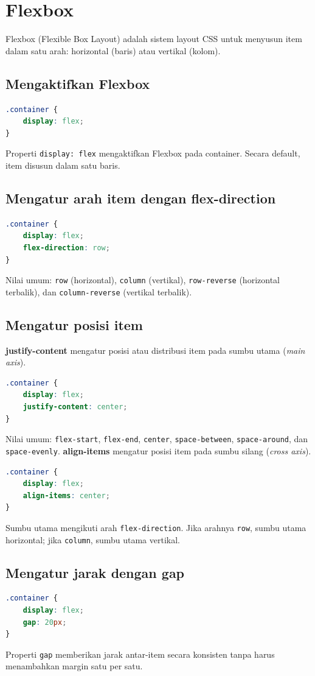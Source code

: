 \documentclass[11pt,a4paper]{article}
\begin{document}
\section{Flexbox}
Flexbox (Flexible Box Layout) adalah sistem layout CSS untuk menyusun item dalam satu arah: horizontal (baris) atau vertikal (kolom).
\subsection{Mengaktifkan Flexbox}
\begin{lstlisting}[language=CSS]
.container {
    display: flex;
}
\end{lstlisting}
Properti \texttt{display: flex} mengaktifkan Flexbox pada container. Secara default, item disusun dalam satu baris.
\subsection{Mengatur arah item dengan flex-direction}
\begin{lstlisting}[language=CSS]
.container {
    display: flex;
    flex-direction: row;
}
\end{lstlisting}
Nilai umum: \texttt{row} (horizontal), \texttt{column} (vertikal), \texttt{row-reverse} (horizontal terbalik), dan \texttt{column-reverse} (vertikal terbalik).
\subsection{Mengatur posisi item}
\textbf{justify-content} mengatur posisi atau distribusi item pada sumbu utama (\textit{main axis}).
\begin{lstlisting}[language=CSS]
.container {
    display: flex;
    justify-content: center;
}
\end{lstlisting}
Nilai umum: \texttt{flex-start}, \texttt{flex-end}, \texttt{center}, \texttt{space-between}, \texttt{space-around}, dan \texttt{space-evenly}.
\textbf{align-items} mengatur posisi item pada sumbu silang (\textit{cross axis}).
\begin{lstlisting}[language=CSS]
.container {
    display: flex;
    align-items: center;
}
\end{lstlisting}
Sumbu utama mengikuti arah \texttt{flex-direction}. Jika arahnya \texttt{row}, sumbu utama horizontal; jika \texttt{column}, sumbu utama vertikal.
\subsection{Mengatur jarak dengan gap}
\begin{lstlisting}[language=CSS]
.container {
    display: flex;
    gap: 20px;
}
\end{lstlisting}
Properti \texttt{gap} memberikan jarak antar-item secara konsisten tanpa harus menambahkan margin satu per satu.
\end{document}
